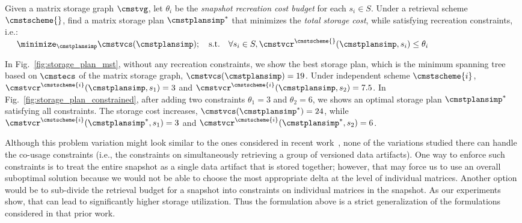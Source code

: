 \documentclass[conference]{IEEEtran}
\begin{document}

\begin{problem}
\label{prob:pas_storage}
Given %
a matrix storage graph $\cmstvg$, let $\theta_i$ be the {\em snapshot recreation cost budget} for each $s_i \in S$. Under a retrieval scheme $\cmstscheme{}$, find a matrix storage plan $\cmstplansimp^*$ that minimizes the \emph{total storage cost}, while satisfying recreation constraints, i.e.:\\
{{\mbox{\ } \ $\minimize_{\cmstplansimp} \cmstvcs(\cmstplansimp); \quad \text{s.t.}\quad \forall s_i \in S, \cmstvcr^{\cmstscheme{}}(\cmstplansimp, s_i) \leq \theta_i$}}
\end{problem}

\begin{example}
In Fig.~\ref{fig:storage_plan_mst}, without any recreation constraints, we show the best storage plan, which is the minimum spanning tree based on $\cmstecs$ of the matrix storage graph, $\cmstvcs(\cmstplansimp) = 19$. Under independent scheme $\cmstscheme{i}$, $\cmstvcr^{\cmstscheme{i}}(\cmstplansimp, s_1) = 3$ and $\cmstvcr^{\cmstscheme{i}}(\cmstplansimp, s_2) = 7.5$. In Fig.~\ref{fig:storage_plan_constrained}, after adding two constraints $\theta_1 = 3$ and $\theta_2 = 6$, we shows an optimal storage plan $\cmstplansimp^*$ satisfying all constraints. The storage cost increases, $\cmstvcs(\cmstplansimp^*) = 24$, while $\cmstvcr^{\cmstscheme{i}}(\cmstplansimp^*, s_1) = 3$ and $\cmstvcr^{\cmstscheme{i}}(\cmstplansimp^*, s_2) = 6$. 
\end{example}

Although this problem variation might look similar to the ones considered in recent work~\cite{vldb15versioning}, none of the variations 
studied there can handle the co-usage constraints (i.e., the constraints on simultaneously retrieving a group of versioned data artifacts). One 
way to enforce such constraints is to treat the entire snapshot as a single data artifact that is stored together; however, that may force
us to use an overall suboptimal solution because we would not be able to choose the most appropriate delta at the level of individual matrices. 
Another option would be to sub-divide the retrieval budget for a snapshot into constraints on individual matrices in the snapshot. As our
experiments show, that can lead to significantly higher storage utilization. 
Thus the formulation above is a strict generalization of the formulations considered in that prior work. %
\end{document}
